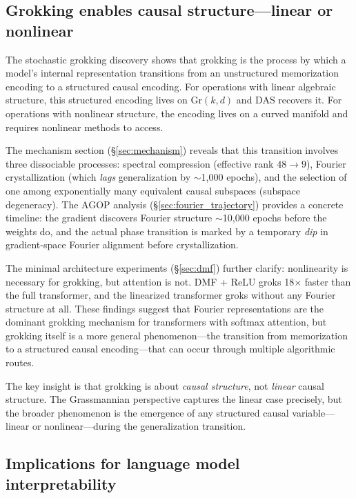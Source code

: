 \documentclass{article}
\newcommand{\Gr}{\mathrm{Gr}}
\begin{document}
\subsection{Grokking enables causal structure---linear or nonlinear}

The stochastic grokking discovery shows that grokking is the process by which a
model's internal representation transitions from an unstructured memorization
encoding to a structured causal encoding. For operations with linear algebraic
structure, this structured encoding lives on $\Gr(k,d)$ and DAS recovers it.
For operations with nonlinear structure, the encoding lives on a curved manifold
and requires nonlinear methods to access.

The mechanism section (\S\ref{sec:mechanism}) reveals that this transition
involves three dissociable processes: spectral compression (effective rank
$48 \to 9$), Fourier crystallization (which \emph{lags} generalization by
$\sim$1{,}000 epochs), and the selection of one among exponentially many
equivalent causal subspaces (subspace degeneracy). The AGOP analysis
(\S\ref{sec:fourier_trajectory}) provides a concrete timeline: the gradient
discovers Fourier structure $\sim$10{,}000 epochs before the weights do,
and the actual phase transition is marked by a temporary \emph{dip} in
gradient-space Fourier alignment before crystallization.

The minimal architecture experiments (\S\ref{sec:dmf}) further clarify:
nonlinearity is necessary for grokking, but attention is not. DMF + ReLU
groks 18$\times$ faster than the full transformer, and the linearized
transformer groks without any Fourier structure at all. These findings
suggest that Fourier representations are the dominant grokking mechanism
for transformers with softmax attention, but grokking itself is a more
general phenomenon---the transition from memorization to a structured
causal encoding---that can occur through multiple algorithmic routes.

The key insight is that grokking is about \emph{causal structure}, not
\emph{linear} causal structure. The Grassmannian perspective captures the linear
case precisely, but the broader phenomenon is the emergence of any structured
causal variable---linear or nonlinear---during the generalization transition.

\subsection{Implications for language model interpretability}
\end{document}
